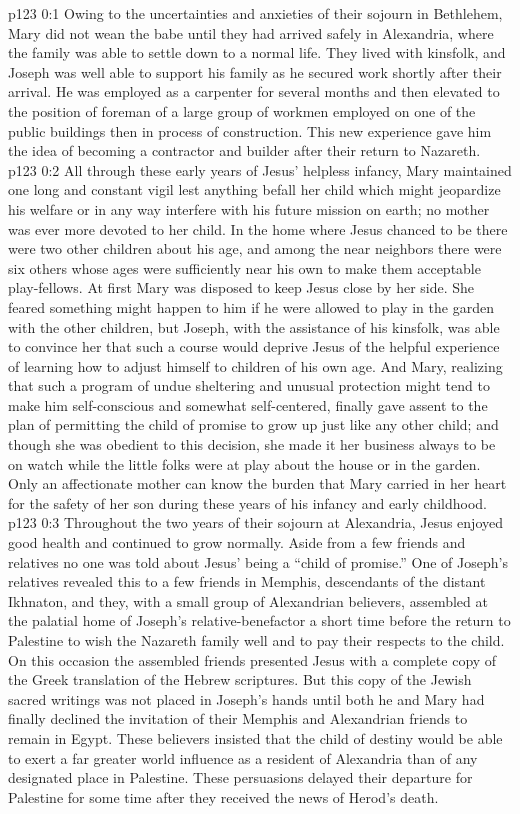 \author{Midwayer Commission}
\vs p123 0:1 Owing to the uncertainties and anxieties of their sojourn in Bethlehem, Mary did not wean the babe until they had arrived safely in Alexandria, where the family was able to settle down to a normal life. They lived with kinsfolk, and Joseph was well able to support his family as he secured work shortly after their arrival. He was employed as a carpenter for several months and then elevated to the position of foreman of a large group of workmen employed on one of the public buildings then in process of construction. This new experience gave him the idea of becoming a contractor and builder after their return to Nazareth.
\pc \vs p123 0:2 All through these early years of Jesus’ helpless infancy, Mary maintained one long and constant vigil lest anything befall her child which might jeopardize his welfare or in any way interfere with his future mission on earth; no mother was ever more devoted to her child. In the home where Jesus chanced to be there were two other children about his age, and among the near neighbors there were six others whose ages were sufficiently near his own to make them acceptable play\hyp{}fellows. At first Mary was disposed to keep Jesus close by her side. She feared something might happen to him if he were allowed to play in the garden with the other children, but Joseph, with the assistance of his kinsfolk, was able to convince her that such a course would deprive Jesus of the helpful experience of learning how to adjust himself to children of his own age. And Mary, realizing that such a program of undue sheltering and unusual protection might tend to make him self\hyp{}conscious and somewhat self\hyp{}centered, finally gave assent to the plan of permitting the child of promise to grow up just like any other child; and though she was obedient to this decision, she made it her business always to be on watch while the little folks were at play about the house or in the garden. Only an affectionate mother can know the burden that Mary carried in her heart for the safety of her son during these years of his infancy and early childhood.
\vs p123 0:3 Throughout the two years of their sojourn at Alexandria, Jesus enjoyed good health and continued to grow normally. Aside from a few friends and relatives no one was told about Jesus’ being a “child of promise.” One of Joseph’s relatives revealed this to a few friends in Memphis, descendants of the distant Ikhnaton, and they, with a small group of Alexandrian believers, assembled at the palatial home of Joseph’s relative\hyp{}benefactor a short time before the return to Palestine to wish the Nazareth family well and to pay their respects to the child. On this occasion the assembled friends presented Jesus with a complete copy of the Greek translation of the Hebrew scriptures. But this copy of the Jewish sacred writings was not placed in Joseph’s hands until both he and Mary had finally declined the invitation of their Memphis and Alexandrian friends to remain in Egypt. These believers insisted that the child of destiny would be able to exert a far greater world influence as a resident of Alexandria than of any designated place in Palestine. These persuasions delayed their departure for Palestine for some time after they received the news of Herod’s death.
